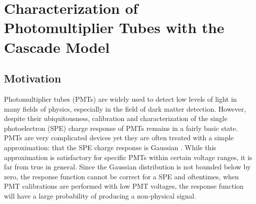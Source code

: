 

\pagestyle{cu}
\graphicspath{{./AppendixB/images/}}

\chapter[Characterization of Photomultiplier Tubes with the Cascade Model][Characterization of Photomultiplier Tubes with the Cascade Model]{Characterization of Photomultiplier Tubes with the Cascade Model}
\label{app:pmts}



\section{Motivation}

Photomultiplier tubes (PMTs) are widely used to detect low levels of light in many fields of physics, especially in the field of dark matter detection.  However, despite their ubiquitousness, calibration and characterization of the single photoelectron (SPE) charge response of PMTs remains in a fairly basic state.  PMTs are very complicated devices yet they are often treated with a simple approximation: that the SPE charge response is Gaussian \cite{bellamy1994absolute, dossi2000methods}. While this approximation is satisfactory for specific PMTs within certain voltage ranges, it is far from true in general.  Since the Gaussian distribution is not bounded below by zero, the response function cannot be correct for a SPE and oftentimes, when PMT calibrations are performed with low PMT voltages, the response function will have a large probability of producing a non-physical signal. 

